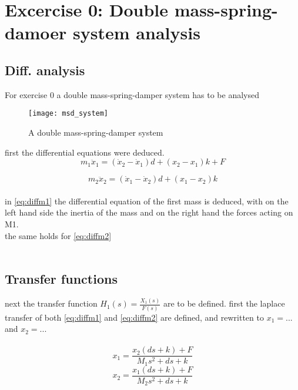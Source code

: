 \documentclass[report.tex]{subfiles}
\begin{document}
\chapter{Excercise 0: Double mass-spring-damoer system analysis}
\section{Diff. analysis}

For exercise 0 a double mass-spring-damper system has to be analysed

\begin{figure}[H]
	\texttt{[image: msd\_system]}
	\centering
	\caption{A double mass-spring-damper system}
	\label{fig:intro_system}
\end{figure}
first the differential equations were deduced.\\

\begin{equation}
\label{eq:diffm1}
{ m }_{ 1 }{ \ddot { x }  }_{ 1 }=({ \dot { x }  }_{ 2 }-\dot { x } _{ 1 })d+({ x }_{ 2 }-{ x }_{ 1 })k+F
\end{equation}

\begin{equation}
\label{eq:diffm2}
{ m }_{ 2 }{ \ddot { x }  }_{ 2 }=({ \dot { x }  }_{ 1 }-\dot { x } _{ 2 })d+({ x }_{ 1 }-{ x }_{ 2 })k
\end{equation}
\\

in \eqref{eq:diffm1} the differential equation of the first mass is deduced, with on the left hand side the inertia of the mass and on the right hand the forces acting on M1.\\
the same holds for \eqref{eq:diffm2}\\
 \\
 \section{Transfer functions}
next the transfer function ${ H }_{ 1 }(s)=\frac { { X }_{ 1 }(s) }{ F(s) } $ are to be defined. first the laplace transfer of both \eqref{eq:diffm1} and \eqref{eq:diffm2} are defined, and rewritten to $x_1=...$ and $x_2=...$\\
 \\
 
\begin{equation}
\label{eq:lap_x1}
x_1=\frac{x_2(ds+k)+F}{M_1s^2+ds+k}
\end{equation}
\begin{equation}
\label{eq:lap_x2}
x_2=\frac{x_1(ds+k)+F}{M_2s^2+ds+k}
\end{equation}
\end{document}
